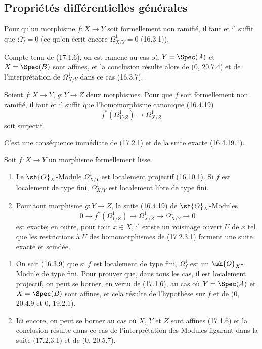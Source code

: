\subsection{Propriétés différentielles générales}
\label{subsection:IV.17.2}

\begin{proposition}[17.2.1]
\label{IV.17.2.1}
Pour qu'un morphisme $f:X\to Y$ soit formellement non ramifié, il faut et il suffit que $\Omega_f^1=0$ (ce qu'on écrit encore $\Omega_{X/Y}^1=0$ (16.3.1)).
\end{proposition}

Compte tenu de (17.1.6), on est ramené au cas où $Y=\Spec(A)$ et $X=\Spec(B)$ sont affines, et la conclusion résulte alors de (0, 20.7.4) et de l'interprétation de $\Omega_{X/Y}^1$ dans ce cas (16.3.7).

\begin{corollary}[17.2.2]
\label{IV.17.2.2}
Soient $f:X\to Y$, $g:Y\to Z$ deux morphismes. Pour que $f$ soit formellement non ramifié, il faut et il suffit que l'homomorphisme canonique (16.4.19)
\[
  f^*(\Omega_{Y/Z}^1)\longrightarrow\Omega_{X/Z}^1
\]
soit surjectif.
\end{corollary}

C'est une conséquence immédiate de (17.2.1) et de la suite exacte (16.4.19.1).

\begin{proposition}[17.2.3]
\label{IV.17.2.3}
Soit $f:X\to Y$ un morphisme formellement lisse.
\begin{enumerate}
  \item[(i)] Le $\sh{O}_X$-Module $\Omega_{X/Y}^1$ est localement projectif (16.10.1). Si $f$ est localement de type fini, $\Omega_{X/Y}^1$ est localement libre de type fini.
  \item[(ii)] Pour tout morphisme $g:Y\to Z$, la suite (16.4.19) de $\sh{O}_X$-Modules
  \[
  \label{IV.17.2.3.1}
    0\longrightarrow f^*(\Omega_{Y/Z}^1)\longrightarrow\Omega_{X/Z}^1\longrightarrow\Omega_{X/Y}^1\longrightarrow0
    \tag{17.2.3.1}
  \]
  est exacte; en outre, pour tout $x\in X$, il existe un voisinage ouvert $U$ de $x$ tel que les restrictions à $U$ des homomorphismes de (17.2.3.1) forment une suite exacte et scindée.
\end{enumerate}
\end{proposition}

\begin{enumerate}
  \item[(i)] On sait (16.3.9) que si $f$ est localement de type fini, $\Omega_f^1$ est un $\sh{O}_X$-Module de type fini. Pour prouver que, dans tous les cas, il est localement projectif, on peut se borner, en vertu de (17.1.6), au cas où $Y=\Spec(A)$ et $X=\Spec(B)$ sont affines, et cela résulte de l'hypothèse sur $f$ et de (0, 20.4.9 et 0, 19.2.1).
  \item[(ii)] Ici encore, on peut se borner au cas où $X$, $Y$ et $Z$ sont affines (17.1.6) et la conclusion résulte dans ce cas de l'interprétation des Modules figurant dans la suite (17.2.3.1) et de (0, 20.5.7).
\end{enumerate}

